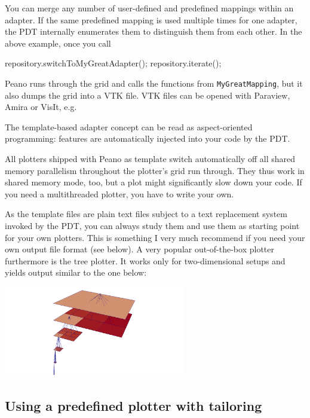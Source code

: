 \noindent
You can merge any number of user-defined and predefined mappings within an
adapter.
If the same predefined mapping is used multiple times for one adapter, the PDT
internally enumerates them to distinguish them from each other.
In the above
example, once you call
\begin{code}
  repository.switchToMyGreatAdapter();
  repository.iterate();
\end{code}
Peano runs through the grid and calls the functions from
\texttt{MyGreatMapping}, but it also dumps the grid into a VTK file. 
VTK files can be opened with Paraview, Amira or VisIt, e.g.


\begin{remark}
  The template-based adapter concept can be read as aspect-oriented programming:
  features are automatically injected into your code by the PDT.
\end{remark}



\begin{remark}
  All plotters shipped with Peano as template switch automatically off all
  shared memory parallelism throughout the plotter's grid run through. They
  thus work in shared memory mode, too, but a plot might significantly slow down
  your code. If you need a multithreaded plotter, you have to write your own.
\end{remark}


\noindent
As the template files are plain text files subject to a text replacement system
invoked by the PDT, you can always study them and use them as starting point for
your own plotters. 
This is something I very much recommend if you need your own output file format
(see below).
A very popular out-of-the-box plotter furthermore is the tree plotter. 
It works only for two-dimensional setups and yields output similar to the one
below:
\begin{center}
  \includegraphics[width=0.6\textwidth]{3_basics/tree01.png}
\end{center}


\subsection{Using a predefined plotter with tailoring}

